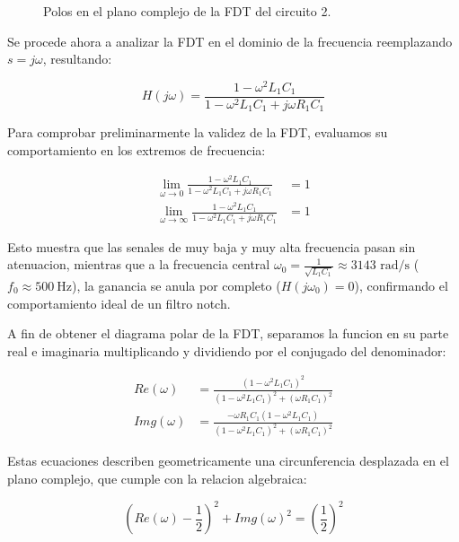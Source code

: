\begin{figure}[H]
  \centering
  
  \caption{Polos en el plano complejo de la FDT del circuito 2.}
  \label{fig:polos_circuito_2}
\end{figure}

Se procede ahora a analizar la FDT en el dominio de la frecuencia reemplazando $s = j\omega$, resultando:

\begin{equation}
  H(j\omega) = \frac{1 - \omega^2 L_1 C_1}{1 - \omega^2 L_1 C_1 + j\omega R_1 C_1}
\end{equation}

Para comprobar preliminarmente la validez de la FDT, evaluamos su comportamiento en los extremos de frecuencia:

\begin{align}
  \lim_{\omega \to 0} \frac{1 - \omega^2 L_1 C_1}{1 - \omega^2 L_1 C_1 + j\omega R_1 C_1} &= 1 \\
  \lim_{\omega \to \infty} \frac{1 - \omega^2 L_1 C_1}{1 - \omega^2 L_1 C_1 + j\omega R_1 C_1} &= 1
\end{align}

Esto muestra que las senales de muy baja y muy alta frecuencia pasan sin atenuacion, mientras que a la frecuencia central $\omega_0 = \frac{1}{\sqrt{L_1 C_1}} \approx \num{3143} \text{ rad/s}$ ($f_0 \approx \SI{500}{\hertz}$), la ganancia se anula por completo ($H(j\omega_0) = 0$), confirmando el comportamiento ideal de un filtro notch.

A fin de obtener el diagrama polar de la FDT, separamos la funcion en su parte real e imaginaria multiplicando y dividiendo por el conjugado del denominador:

\begin{align}
  Re(\omega) &= \frac{(1 - \omega^2 L_1 C_1)^2}{(1 - \omega^2 L_1 C_1)^2 + (\omega R_1 C_1)^2} \\
  Img(\omega) &= \frac{-\omega R_1 C_1 (1 - \omega^2 L_1 C_1)}{(1 - \omega^2 L_1 C_1)^2 + (\omega R_1 C_1)^2}
\end{align}

Estas ecuaciones describen geometricamente una circunferencia desplazada en el plano complejo, que cumple con la relacion algebraica:

\begin{equation}
  \left(Re(\omega) - \frac{1}{2}\right)^2 + Img(\omega)^2 = \left(\frac{1}{2}\right)^2
\end{equation}

